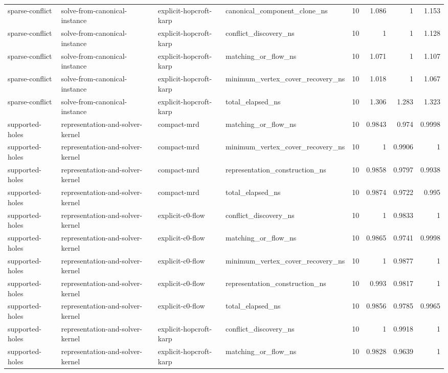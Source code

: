 \begin{table}[t]
\begin{tabular}{llllrrrr}
sparse-conflict & solve-from-canonical-instance & explicit-hopcroft-karp & canonical\_component\_clone\_ns & 10 & 1.086 & 1 & 1.153 \\
sparse-conflict & solve-from-canonical-instance & explicit-hopcroft-karp & conflict\_discovery\_ns & 10 & 1 & 1 & 1.128 \\
sparse-conflict & solve-from-canonical-instance & explicit-hopcroft-karp & matching\_or\_flow\_ns & 10 & 1.071 & 1 & 1.107 \\
sparse-conflict & solve-from-canonical-instance & explicit-hopcroft-karp & minimum\_vertex\_cover\_recovery\_ns & 10 & 1.018 & 1 & 1.067 \\
sparse-conflict & solve-from-canonical-instance & explicit-hopcroft-karp & total\_elapsed\_ns & 10 & 1.306 & 1.283 & 1.323 \\
supported-holes & representation-and-solver-kernel & compact-mrd & matching\_or\_flow\_ns & 10 & 0.9843 & 0.974 & 0.9998 \\
supported-holes & representation-and-solver-kernel & compact-mrd & minimum\_vertex\_cover\_recovery\_ns & 10 & 1 & 0.9906 & 1 \\
supported-holes & representation-and-solver-kernel & compact-mrd & representation\_construction\_ns & 10 & 0.9858 & 0.9797 & 0.9938 \\
supported-holes & representation-and-solver-kernel & compact-mrd & total\_elapsed\_ns & 10 & 0.9874 & 0.9722 & 0.995 \\
supported-holes & representation-and-solver-kernel & explicit-c0-flow & conflict\_discovery\_ns & 10 & 1 & 0.9833 & 1 \\
supported-holes & representation-and-solver-kernel & explicit-c0-flow & matching\_or\_flow\_ns & 10 & 0.9865 & 0.9741 & 0.9998 \\
supported-holes & representation-and-solver-kernel & explicit-c0-flow & minimum\_vertex\_cover\_recovery\_ns & 10 & 1 & 0.9877 & 1 \\
supported-holes & representation-and-solver-kernel & explicit-c0-flow & representation\_construction\_ns & 10 & 0.993 & 0.9817 & 1 \\
supported-holes & representation-and-solver-kernel & explicit-c0-flow & total\_elapsed\_ns & 10 & 0.9856 & 0.9785 & 0.9965 \\
supported-holes & representation-and-solver-kernel & explicit-hopcroft-karp & conflict\_discovery\_ns & 10 & 1 & 0.9918 & 1 \\
supported-holes & representation-and-solver-kernel & explicit-hopcroft-karp & matching\_or\_flow\_ns & 10 & 0.9828 & 0.9639 & 1 \\

\end{tabular}
\end{table}
